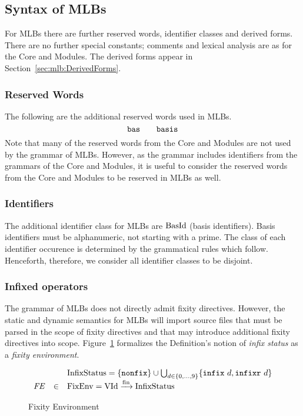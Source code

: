 \subsection{Syntax of MLBs}
For MLBs there are further reserved words, identifier classes and
derived forms.  There are no further special constants; comments and
lexical analysis are as for the Core and Modules.  The derived forms
appear in Section~\ref{sec:mlb:DerivedForms}.
%
\subsubsection{Reserved Words}
The following are the additional reserved words used in MLBs.
\begin{displaymath}
\mathtt{bas} \quad\quad \mathtt{basis}
\end{displaymath}
Note that many of the reserved words from the Core and Modules are not
used by the grammar of MLBs.  However, as the grammar includes
identifiers from the grammars of the Core and Modules, it is useful to
consider the reserved words from the Core and Modules to be reserved
in MLBs as well.
%
\subsubsection{Identifiers}
The additional identifier class for MLBs are $\mathrm{BasId}$ (basis
identifiers).  Basis identifiers must be alphanumeric, not starting
with a prime.  The class of each identifier occurence is determined by
the grammatical rules which follow.  Henceforth, therefore, we
consider all identifier classes to be disjoint.
%
\subsubsection{Infixed operators}
The grammar of MLBs does not directly admit fixity directives.
However, the static and dynamic semantics for MLBs will import source
files that must be parsed in the scope of fixity directives and that
may introduce additional fixity directives into scope.
Figure~\ref{fig:mlb:S:FixityEnv} formalizes the Definition's notion of
\emph{infix status} as a \emph{fixity environment}.
\begin{figure}[h]
\begin{displaymath}
\begin{array}{rcl}
 & & \mathrm{InfixStatus} = \{\mathtt{nonfix}\} \cup \bigcup_{d \in \{0,\ldots,9\}} \{\mathtt{infix}~d, \mathtt{infixr}~d\} \\
\mathit{FE} & \in & \mathrm{FixEnv} = \mathrm{VId} \xrightarrow{\mathrm{fin}} \mathrm{InfixStatus} \end{array}
\end{displaymath}
\caption{Fixity Environment}\label{fig:mlb:S:FixityEnv}
\end{figure}
%
